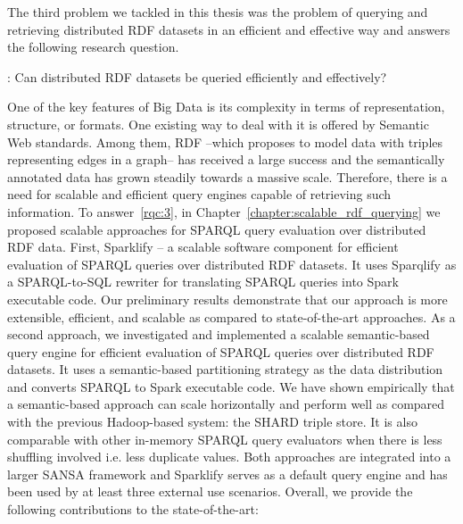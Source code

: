 The third problem we tackled in this thesis was the problem of querying and retrieving distributed \gls{RDF} datasets in an efficient and effective way and answers the following research question.

\begin{tcolorbox}
\textbf{\rqNr[RQ3]\label{rqc:3}}: Can distributed \gls{RDF} datasets be queried efficiently and effectively?
\end{tcolorbox}

One of the key features of Big Data is its complexity in terms of representation, structure, or formats.
One existing way to deal with it is offered by Semantic Web standards.
Among them, \gls{RDF} --which proposes to model data with triples representing edges in a graph-- has received a large success and the semantically annotated data has grown steadily towards a massive scale.
Therefore, there is a need for scalable and efficient query engines capable of retrieving such information.
To answer~\ref{rqc:3}, in Chapter~\ref{chapter:scalable_rdf_querying} we proposed scalable approaches for \gls{SPARQL} query evaluation over distributed \gls{RDF} data. 
First, Sparklify -- a scalable software component for efficient evaluation of \gls{SPARQL} queries over distributed \gls{RDF} datasets. 
It uses Sparqlify as a SPARQL-to-SQL rewriter for translating SPARQL queries into Spark executable code.
Our preliminary results demonstrate that our approach is more extensible, efficient, and scalable as compared to state-of-the-art approaches.
As a second approach, we investigated and implemented a scalable semantic-based query engine for efficient evaluation of \gls{SPARQL} queries over distributed \gls{RDF} datasets. 
It uses a semantic-based partitioning strategy as the data distribution and converts \gls{SPARQL} to Spark executable code.
We have shown empirically that a semantic-based approach can scale horizontally and perform well as compared with the previous Hadoop-based system: the SHARD triple store.
It is also comparable with other in-memory \gls{SPARQL} query evaluators when there is less shuffling involved i.e. less duplicate values.
Both approaches are integrated into a larger SANSA framework and Sparklify serves as a default query engine and has been used by at least three external use scenarios.
Overall, we provide the following contributions to the state-of-the-art:

